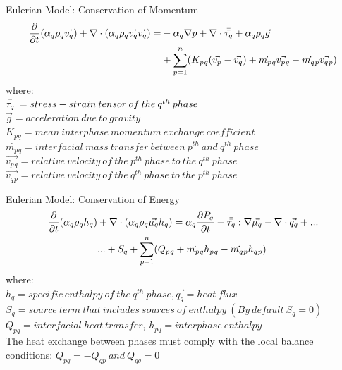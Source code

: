 \begin{frame}{Eulerian Model: Conservation of Momentum}
    \begin{equation} \label{ffmansys_eqn}
    \begin{split}
    \frac{\partial}{\partial t }(\alpha_q\rho_q\vec{v_q}) 
    + \nabla\cdot(\alpha_q\rho_q\vec{v_q}\vec{v_q})
    = & -\alpha_q\nabla p + \nabla\cdot\Bar{\Bar{\tau_q}} 
    + \alpha_q\rho_q\vec{g} \\
    &+ \sum_{p=1}^{n} (K_p{}_q(\vec{v_p}-\vec{v_q}) + \Dot{m_p{}_q}\vec{v_p{}_q} - \Dot{m_q{}_p}\vec{v_q{}_p}) 
    \end{split}
\end{equation}
where:\\
$ \Bar{\Bar{\tau_q}}\: = stress-strain \:tensor \:of \:the \:q^{th} \:phase$\\
$ \vec{g} = acceleration\:due \:to\:gravity$\\
$K_p{}_q = mean\: interphase\: momentum\: exchange\: coefficient$\\
$\Dot{m_p{}_q} = interfacial\: mass\: transfer\: between\: p^{th}\: and\:q^{th}\:phase$\\
$\vec{v_p{}_q} = relative \: velocity\: of\: the\: p^{th}\: phase\: to\: the\: q^{th}\: phase $\\
$\vec{v_q{}_p} = relative \: velocity\: of\: the\: q^{th}\: phase\: to\: the\: p^{th}\: phase $\\
\end{frame}

\begin{frame}{Eulerian Model: Conservation of Energy}
    \begin{equation}\label{gcoe_eqn}
    \begin{split}
       \frac{\partial}{\partial t }(\alpha_q\rho_q h_q)
       &+ \nabla\cdot(\alpha_q\rho_q\vec{\mu_q} h_q)=\alpha_q\frac{\partial P_q}{\partial t}+\Bar{\Bar{\tau_q}}:\nabla\vec{\mu_q}-\nabla\cdot\vec{q_q}+ ... \\ &...+S_q+\sum_{p=1}^{n}(Q_p{}_q + \Dot{m_p{}_q} h_p{}_q - \Dot{m_q{}_p} h_q{}_p)
    \end{split}
\end{equation}
where:\\
$h_q = specific\: enthalpy\: of\: the\: q^{th}\:phase,\vec{q_q} = heat \: flux $\\
$S_q = source\: term\:that \: includes\:sources\:of\:enthalpy\:(By\:default\:S_q=0) $\\
$Q_{pq} = interfacial\:heat\:transfer $, $h_{pq} = interphase\:enthalpy$\\
The heat exchange between phases must comply with the local balance conditions: 
$Q_{pq}=-Q_{qp}\:and\:Q_{qq}=0 $\\
\end{frame}

